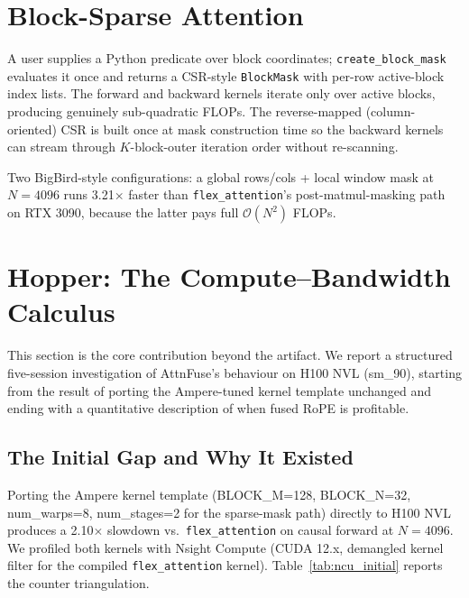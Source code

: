\documentclass[10pt,twocolumn]{article}
\begin{document}
\section{Block-Sparse Attention}
\label{sec:blocksparse}

A user supplies a Python predicate over block coordinates;
\texttt{create\_block\_mask} evaluates it once and returns a
CSR-style \texttt{BlockMask} with per-row active-block index lists.
The forward and backward kernels iterate only over active blocks,
producing genuinely sub-quadratic FLOPs. The reverse-mapped (column-
oriented) CSR is built once at mask construction time so the
backward kernels can stream through $K$-block-outer iteration order
without re-scanning.

Two BigBird-style configurations: a global rows/cols + local window
mask at $N{=}4096$ runs 3.21$\times$ faster than
\texttt{flex\_attention}'s post-matmul-masking path on RTX 3090,
because the latter pays full $\mathcal{O}(N^2)$ FLOPs.

\section{Hopper: The Compute--Bandwidth Calculus}
\label{sec:hopper}

This section is the core contribution beyond the artifact. We
report a structured five-session investigation of AttnFuse's
behaviour on H100 NVL (sm\_90), starting from the result of porting
the Ampere-tuned kernel template unchanged and ending with a
quantitative description of when fused RoPE is profitable.

\subsection{The Initial Gap and Why It Existed}
\label{sec:hopper_initial}

Porting the Ampere kernel template (BLOCK\_M=128, BLOCK\_N=32,
num\_warps=8, num\_stages=2 for the sparse-mask path) directly to
H100 NVL produces a 2.10$\times$ slowdown vs.\
\texttt{flex\_attention} on causal forward at $N{=}4096$. We
profiled both kernels with Nsight Compute (CUDA 12.x, demangled
kernel filter for the compiled \texttt{flex\_attention} kernel).
Table~\ref{tab:ncu_initial} reports the counter triangulation.
\end{document}
